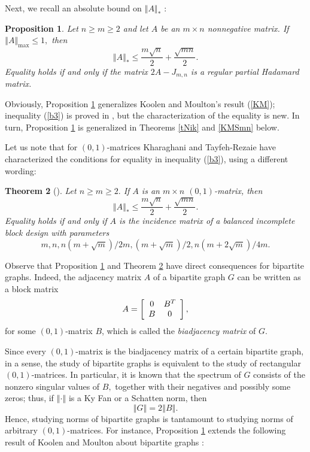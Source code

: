 \documentclass[12pt]{article}%
\newtheorem{theorem}{Theorem}[section]
\newtheorem{proposition}[theorem]{Proposition}
\begin{document}
Next, we recall an absolute bound on $\left\Vert A\right\Vert _{\ast}$ :

\begin{proposition}
\label{pronn}Let $n\geq m\geq2$ and let $A$ be an $m\times n$ nonnegative
matrix. If $\left\Vert A\right\Vert _{\max}\leq1,$ then
\begin{equation}
\left\Vert A\right\Vert _{\ast}\leq\frac{m\sqrt{n}}{2}+\frac{\sqrt{mn}}{2}.
\label{b3}%
\end{equation}
Equality holds if and only if the matrix $2A-J_{m,n}$ is a regular partial
Hadamard matrix.
\end{proposition}

Obviously, Proposition \ref{pronn} generalizes Koolen and Moulton's result
(\ref{KM}); inequality (\ref{b3}) is proved in \cite{Nik07i}, but the
characterization of the equality is new. In turn, Proposition \ref{pronn} is
generalized in Theorems \ref{tNik} and \ref{KMSmn} below.

Let us note that for $\left(  0,1\right)  $-matrices Kharaghani and
Tayfeh-Rezaie \cite{KhRe08} have characterized the conditions for equality in
inequality (\ref{b3}), using a different wording:

\begin{theorem}
[\cite{KhRe08}]\label{ThKTR}Let $n\geq m\geq2.$ If $A$ is an $m\times n$
$\left(  0,1\right)  $-matrix, then%
\[
\left\Vert A\right\Vert _{\ast}\leq\frac{m\sqrt{n}}{2}+\frac{\sqrt{mn}}{2}.
\]
Equality holds if and only if $A$ is the incidence matrix of a balanced
incomplete block design with parameters%
\[
m,n,n(m+\sqrt{m})/2m,(m+\sqrt{m})/2,n(m+2\sqrt{m})/4m.
\]

\end{theorem}

Observe that Proposition \ref{pronn} and Theorem \ref{ThKTR} have direct
consequences for bipartite graphs. Indeed, the adjacency matrix $A$ of a
bipartite graph $G$ can be written as a block matrix%
\[
A=\left[
\begin{array}
[c]{cc}%
0 & B^{T}\\
B & 0
\end{array}
\right]  ,
\]
for some $\left(  0,1\right)  $-matrix $B$, which is called the\emph{
biadjacency matrix} of $G.$

Since every $\left(  0,1\right)  $-matrix is the biadjacency matrix of a
certain bipartite graph, in a sense, the study of bipartite graphs is
equivalent to the study of rectangular $\left(  0,1\right)  $-matrices. In
particular, it is known that the spectrum of $G$ consists of the nonzero
singular values of $B,$ together with their negatives and possibly some zeros;
thus, if $\left\Vert \cdot\right\Vert $ is a Ky Fan or a Schatten norm, then
\[
\left\Vert G\right\Vert =2\left\Vert B\right\Vert .
\]
Hence, studying norms of bipartite graphs is tantamount to studying norms of
arbitrary $\left(  0,1\right)  $-matrices. For instance, Proposition
\ref{pronn} extends the following result of Koolen and Moulton about bipartite
graphs \cite{KoMo03}:\medskip
\end{document}
